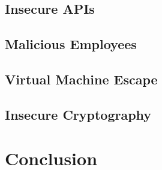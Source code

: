 \subsection{Insecure APIs}

\subsection{Malicious Employees}

\subsection{Virtual Machine Escape}

\subsection{Insecure Cryptography}

\section{Conclusion}
